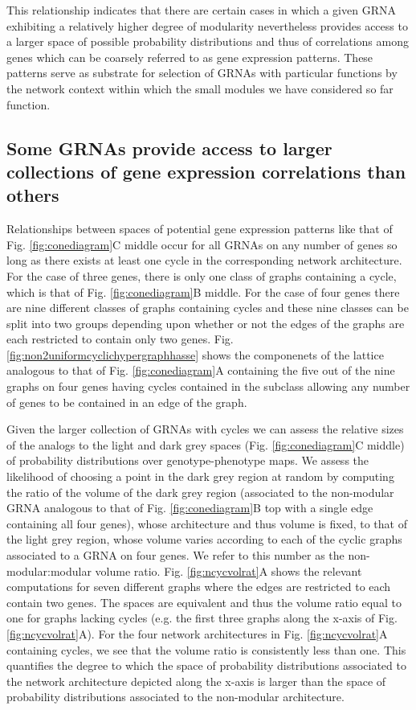 This relationship indicates that there are certain cases in which a given GRNA exhibiting a relatively higher degree of modularity nevertheless provides access to a larger space of possible probability distributions and thus of correlations among genes which can be coarsely referred to as gene expression patterns. These patterns serve as substrate for selection of GRNAs with particular functions by the network context within which the small modules we have considered so far function.

\subsection*{Some GRNAs provide access to larger collections of gene expression correlations than others}
Relationships between spaces of potential gene expression patterns like that of Fig. \ref{fig:conediagram}C middle occur for all GRNAs on any number of genes so long as there exists at least one cycle in the corresponding network architecture. For the case of three genes, there is only one class of graphs containing a cycle, which is that of Fig. \ref{fig:conediagram}B middle. For the case of four genes there are nine different classes of graphs containing cycles and these nine classes can be split into two groups depending upon whether or not the edges of the graphs are each restricted to contain only two genes. Fig. \ref{fig:non2uniformcyclichypergraphhasse} shows the componenets of the lattice analogous to that of Fig. \ref{fig:conediagram}A containing the five out of the nine graphs on four genes having cycles contained in the subclass allowing any number of genes to be contained in an edge of the graph.

Given the larger collection of GRNAs with cycles we can assess the relative sizes of the analogs to the light and dark grey spaces (Fig. \ref{fig:conediagram}C middle) of probability distributions over genotype-phenotype maps. We assess the likelihood of choosing a point in the dark grey region at random by computing the ratio of the volume of the dark grey region (associated to the non-modular GRNA analogous to that of Fig. \ref{fig:conediagram}B top with a single edge containing all four genes), whose architecture and thus volume is fixed, to that of the light grey region, whose volume varies according to each of the cyclic graphs associated to a GRNA on four genes. We refer to this number as the non-modular:modular volume ratio. Fig. \ref{fig:ncycvolrat}A shows the relevant computations for seven different graphs where the edges are restricted to each contain two genes. The spaces are equivalent and thus the volume ratio equal to one for graphs lacking cycles (e.g. the first three graphs along the x-axis of Fig. \ref{fig:ncycvolrat}A). For the four network architectures in Fig. \ref{fig:ncycvolrat}A containing cycles, we see that the volume ratio is consistently less than one. This quantifies the degree to which the space of probability distributions associated to the network architecture depicted along the x-axis is larger than the space of probability distributions associated to the non-modular architecture.

